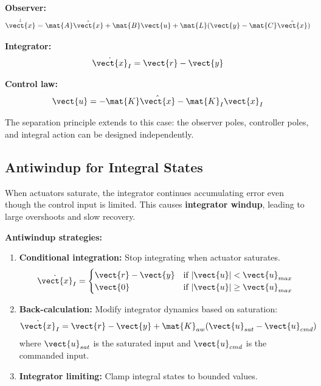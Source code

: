 \textbf{Observer:}
\begin{equation}
\dot{\hat{\vect{x}}} = \mat{A}\hat{\vect{x}} + \mat{B}\vect{u} + \mat{L}(\vect{y} - \mat{C}\hat{\vect{x}})
\end{equation}

\textbf{Integrator:}
\begin{equation}
\dot{\vect{x}}_I = \vect{r} - \vect{y}
\end{equation}

\textbf{Control law:}
\begin{equation}
\vect{u} = -\mat{K}\hat{\vect{x}} - \mat{K}_I\vect{x}_I
\end{equation}

The separation principle extends to this case: the observer poles, controller poles, and integral action can be designed independently.

\subsection{Antiwindup for Integral States}

When actuators saturate, the integrator continues accumulating error even though the control input is limited. This causes \textbf{integrator windup}, leading to large overshoots and slow recovery.

\textbf{Antiwindup strategies:}

\begin{enumerate}
    \item \textbf{Conditional integration:} Stop integrating when actuator saturates.
    \begin{equation}
    \dot{\vect{x}}_I = \begin{cases}
    \vect{r} - \vect{y} & \text{if } |\vect{u}| < \vect{u}_{max} \\
    \vect{0} & \text{if } |\vect{u}| \geq \vect{u}_{max}
    \end{cases}
    \end{equation}

    \item \textbf{Back-calculation:} Modify integrator dynamics based on saturation:
    \begin{equation}
    \dot{\vect{x}}_I = \vect{r} - \vect{y} + \mat{K}_{aw}(\vect{u}_{sat} - \vect{u}_{cmd})
    \end{equation}
    where $\vect{u}_{sat}$ is the saturated input and $\vect{u}_{cmd}$ is the commanded input.

    \item \textbf{Integrator limiting:} Clamp integral states to bounded values.
\end{enumerate}

